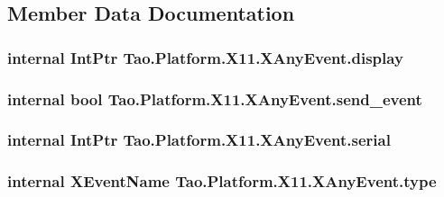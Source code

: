 \subsection{Member Data Documentation}
\hypertarget{struct_tao_1_1_platform_1_1_x11_1_1_x_any_event_a2fd1c3e11e7c316bd06959998f106fbe}{
\subsubsection[{display}]{\setlength{\rightskip}{0pt plus 5cm}internal IntPtr {\bf Tao.Platform.X11.XAnyEvent.display}}}
\label{struct_tao_1_1_platform_1_1_x11_1_1_x_any_event_a2fd1c3e11e7c316bd06959998f106fbe}
\hypertarget{struct_tao_1_1_platform_1_1_x11_1_1_x_any_event_a87ed3046473de6eed6e0d81139ceb9d8}{
\subsubsection[{send\_\-event}]{\setlength{\rightskip}{0pt plus 5cm}internal bool {\bf Tao.Platform.X11.XAnyEvent.send\_\-event}}}
\label{struct_tao_1_1_platform_1_1_x11_1_1_x_any_event_a87ed3046473de6eed6e0d81139ceb9d8}
\hypertarget{struct_tao_1_1_platform_1_1_x11_1_1_x_any_event_a0022825df82690c2e70f470991dd9ef0}{
\subsubsection[{serial}]{\setlength{\rightskip}{0pt plus 5cm}internal IntPtr {\bf Tao.Platform.X11.XAnyEvent.serial}}}
\label{struct_tao_1_1_platform_1_1_x11_1_1_x_any_event_a0022825df82690c2e70f470991dd9ef0}
\hypertarget{struct_tao_1_1_platform_1_1_x11_1_1_x_any_event_a208b9bad10c608cdf800e361460a891d}{
\subsubsection[{type}]{\setlength{\rightskip}{0pt plus 5cm}internal {\bf XEventName} {\bf Tao.Platform.X11.XAnyEvent.type}}}
